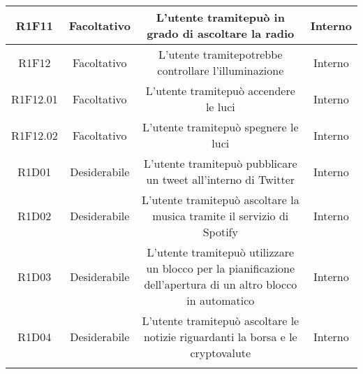 \begin{tabularx}{\textwidth}{|C|C|C|C|}
	R1F11& Facoltativo  &L'utente tramitepuò in grado di ascoltare la radio &Interno \\
	\hline	
	R1F12& Facoltativo  &L'utente tramitepotrebbe controllare l'illuminazione &Interno \\
	\hline
	R1F12.01& Facoltativo  &L'utente tramitepuò accendere le luci &Interno \\
	\hline
	R1F12.02& Facoltativo  &L'utente tramitepuò spegnere le luci &Interno \\
	\hline
	R1D01&Desiderabile  &L'utente tramitepuò pubblicare un tweet all'interno di Twitter &Interno \\
	\hline
	R1D02&Desiderabile  &L'utente tramitepuò ascoltare la musica tramite il servizio di Spotify &Interno \\
	\hline
	R1D03&Desiderabile  &L'utente tramitepuò utilizzare un blocco per la pianificazione dell'apertura di un altro blocco in automatico &Interno \\
	\hline
	R1D04&Desiderabile  &L'utente tramitepuò ascoltare le notizie riguardanti la borsa e le cryptovalute &Interno \\
	\hline
	\caption{Tabella requisiti funzionali}
\end{tabularx}


